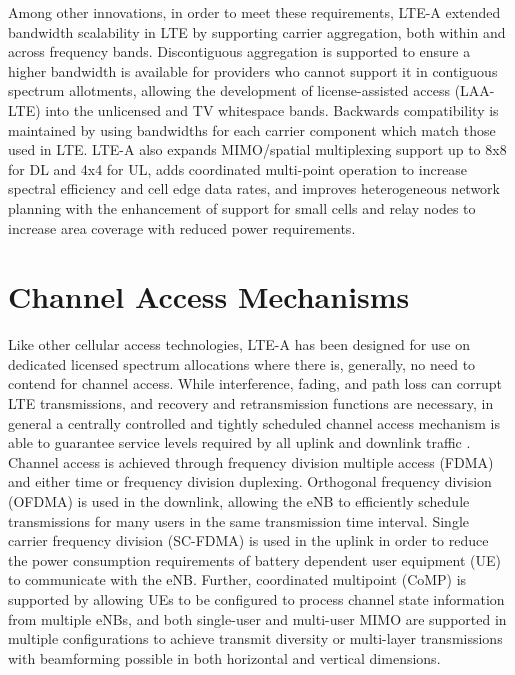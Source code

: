 Among other innovations, in order to meet these requirements, LTE-A extended bandwidth scalability in LTE by supporting carrier aggregation, both within and across frequency bands.   Discontiguous aggregation is supported to ensure a higher bandwidth is available for providers who cannot support it in contiguous spectrum allotments, allowing the development of license-assisted access (LAA-LTE) into the unlicensed and TV whitespace bands.  Backwards compatibility is maintained by using bandwidths for each carrier component which match those used in LTE.  LTE-A also expands MIMO/spatial multiplexing support up to 8x8 for DL and 4x4 for UL, adds coordinated multi-point operation to increase spectral efficiency and cell edge data rates, and improves heterogeneous network planning with the enhancement of support for small cells and relay nodes to increase area coverage with reduced power requirements.

\section{Channel Access Mechanisms}
\label{channel-access}
Like other cellular access technologies, LTE-A has been designed for use on dedicated licensed spectrum allocations where there is, generally, no need to contend for channel access.  While interference, fading, and path loss can corrupt LTE transmissions, and recovery and retransmission functions are necessary, in general a centrally controlled and tightly scheduled channel access mechanism is able to guarantee service levels required by all uplink and downlink traffic \cite{tr36300}.  Channel access is achieved through frequency division multiple access (FDMA) and either time or frequency division duplexing.  Orthogonal frequency division (OFDMA) is used in the downlink, allowing the eNB to efficiently schedule transmissions for many users in the same transmission time interval.  Single carrier frequency division (SC-FDMA) is used in the uplink in order to reduce the power consumption requirements of battery dependent user equipment (UE) to communicate with the eNB.  Further, coordinated multipoint (CoMP) is supported by allowing UEs to be configured to process channel state information from multiple eNBs, and both single-user and multi-user MIMO are supported in multiple configurations to achieve transmit diversity or multi-layer transmissions with beamforming possible in both horizontal and vertical dimensions.

